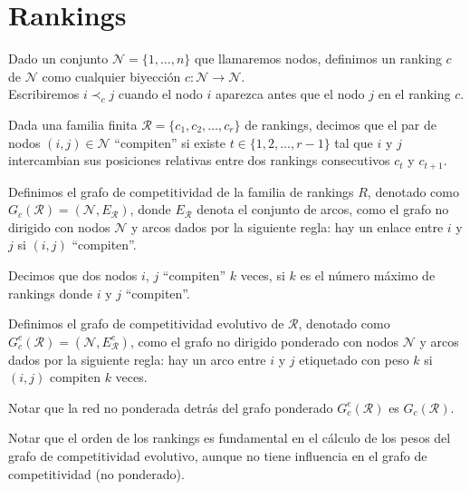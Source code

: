 \section{Rankings}

\begin{defi}
Dado un conjunto $\mathcal{N} = \{1,\dots,n\}$ que llamaremos nodos, definimos un ranking $c$ de $\mathcal{N}$ como cualquier biyección $c: \mathcal{N} \to \mathcal{N}$.\\
Escribiremos $i \prec_c j$ cuando el nodo $i$ aparezca antes que el nodo $j$ en el ranking $c$.
\end{defi}

\begin{defi}
Dada una familia finita $\mathcal{R} = \{c_1,c_2,\dots, c_r\}$ de rankings, decimos que el par de nodos $(i,j) \in \mathcal{N}$ ``compiten'' si existe $t \in \{1,2,\dots, r-1\}$ tal que $i$ y $j$ intercambian sus posiciones relativas entre dos rankings consecutivos $c_t$ y $c_{t+1}$.
\end{defi}

\begin{defi}
Definimos el grafo de competitividad de la familia de rankings $R$, denotado como $G_c(\mathcal{R}) = (\mathcal{N}, E_\mathcal{R})$, donde $E_\mathcal{R}$ denota el conjunto de arcos, como el grafo no dirigido con nodos $\mathcal{N}$ y arcos dados por la siguiente regla: hay un enlace entre $i$ y $j$ si $(i,j)$ ``compiten''.
\end{defi}

\begin{defi}
Decimos que dos nodos $i$, $j$ ``compiten'' $k$ veces, si $k$ es el número máximo de rankings donde $i$ y $j$ ``compiten''.
\end{defi}

\begin{defi}
Definimos el grafo de competitividad evolutivo de $\mathcal{R}$, denotado como $G_c^e(\mathcal{R}) = (\mathcal{N}, E_\mathcal{R}^e)$, como el grafo no dirigido ponderado con nodos $\mathcal{N}$ y arcos dados por la siguiente regla: hay un arco entre $i$ y $j$ etiquetado con peso $k$ si $(i,j)$ compiten $k$ veces.
\end{defi}

\begin{nota}
Notar que la red no ponderada detrás del grafo ponderado $G_c^e(\mathcal{R})$ es $G_c(\mathcal{R})$.
\end{nota}

\begin{nota}
Notar que el orden de los rankings es fundamental en el cálculo de los pesos del grafo de competitividad evolutivo, aunque no tiene influencia en el grafo de competitividad (no ponderado).
\end{nota}

